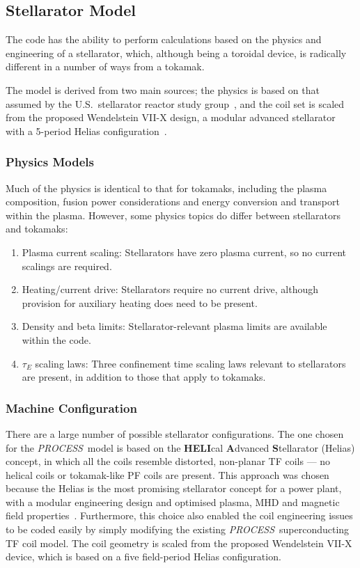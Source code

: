 \documentclass[11pt,a4paper]{report}
\newcommand{\PS}{\mbox{\it PROCESS\/ }}
\begin{document}
\subsection{Stellarator Model}
The code has the ability to perform calculations based on the physics and
engineering of a stellarator, which, although being a toroidal device, is
radically different in a number of ways from a tokamak.

The model is derived from two main sources; the physics is based on that
assumed by the U.S.\ stellarator reactor study group~\cite{USSRSG}, and the
coil set is scaled from the proposed Wendelstein VII-X design, a modular
advanced stellarator with a 5-period Helias configuration~\cite{W7X}.

\subsubsection{Physics Models}
Much of the physics is identical to that for tokamaks, including the plasma
composition, fusion power considerations and energy conversion and transport
within the plasma. However, some physics topics do differ between stellarators
and tokamaks:
\begin{enumerate}
\item Plasma current scaling: Stellarators have zero plasma current, so no
current scalings are required.
\item Heating/current drive: Stellarators require no current drive, although
provision for auxiliary heating does need to be present.
\item Density and beta limits: Stellarator-relevant plasma limits are
available within the code.
\item $\tau_E$ scaling laws: Three confinement time scaling laws
relevant to stellarators are present, in addition to those that apply to
tokamaks.
\end{enumerate}

\subsubsection{Machine Configuration}
There are a large number of possible stellarator configurations. The one
chosen for the \PS model is based on the {\bf HELI}cal {\bf A}dvanced {\bf
S}tellarator (Helias) concept, in which all the coils resemble distorted,
non-planar TF coils --- no helical coils or tokamak-like PF coils are present.
This approach was chosen because the Helias is the most promising stellarator
concept for a power plant, with a modular engineering design and optimised
plasma, MHD and magnetic field properties~\cite{HSR}. Furthermore, this choice
also enabled the coil engineering issues to be coded easily by simply
modifying the existing \PS superconducting TF coil model. The coil geometry is
scaled from the proposed Wendelstein VII-X device, which is based on a five
field-period Helias configuration.
\end{document}
